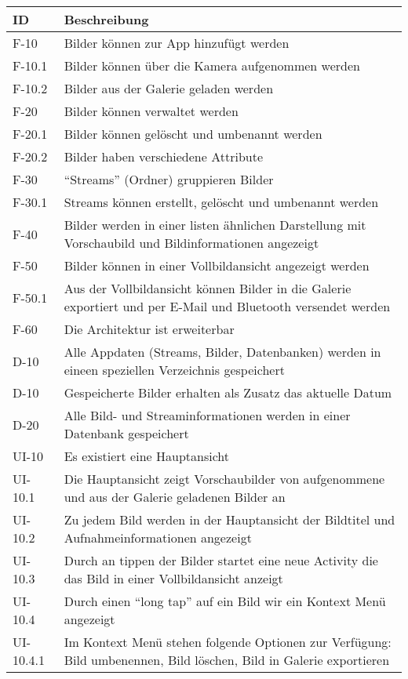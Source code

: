 \begin{center}
\begin{longtable}{|l|p{12cm}|}
\toprule
\textbf{ID} & \textbf{Beschreibung} \\
\hline
\endhead
\hline
\endfoot
F-10 & Bilder können zur App hinzufügt werden\\
F-10.1 & Bilder können über die Kamera aufgenommen werden\\
F-10.2 & Bilder aus der Galerie geladen werden\\
F-20 & Bilder können verwaltet werden\\
F-20.1 & Bilder können gelöscht und umbenannt werden\\
F-20.2 & Bilder haben verschiedene Attribute\\
F-30 & \enquote{Streams} (Ordner) gruppieren Bilder\\
F-30.1 & Streams können erstellt, gelöscht und umbenannt werden\\
F-40 & Bilder werden in einer listen ähnlichen Darstellung mit Vorschaubild und Bildinformationen angezeigt\\
F-50 & Bilder können in einer Vollbildansicht angezeigt werden\\
F-50.1 & Aus der Vollbildansicht können Bilder in die Galerie exportiert und per E-Mail und Bluetooth versendet werden\\
F-60 & Die Architektur ist erweiterbar\\
\hline
D-10 & Alle Appdaten (Streams, Bilder, Datenbanken) werden in eineen speziellen Verzeichnis gespeichert\\
D-10 & Gespeicherte Bilder erhalten als Zusatz das aktuelle Datum\\
D-20 & Alle Bild- und Streaminformationen werden in einer Datenbank gespeichert\\
\hline
UI-10 &  Es existiert eine Hauptansicht\\
UI-10.1 &  Die Hauptansicht zeigt Vorschaubilder von aufgenommene und aus der Galerie geladenen Bilder an\\
UI-10.2 &  Zu jedem Bild werden in der Hauptansicht der Bildtitel und Aufnahmeinformationen angezeigt\\
UI-10.3 &  Durch an tippen der Bilder startet eine neue Activity die das Bild in einer Vollbildansicht anzeigt\\
UI-10.4 &  Durch einen \enquote{long tap} auf ein Bild wir ein Kontext Menü angezeigt\\
UI-10.4.1 & Im Kontext Menü stehen folgende Optionen zur Verfügung: Bild umbenennen, Bild löschen, Bild in Galerie exportieren\\

\end{longtable}
\end{center}
